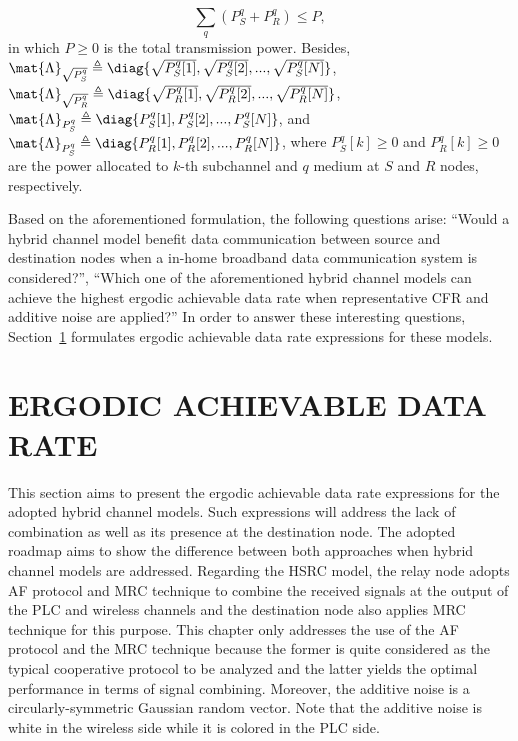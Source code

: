 \begin{equation}
	\sum_{q} (P_{S}^q + P_{R}^q) \leq P,
\end{equation}
in which $P \geq 0$ is the total transmission power. Besides, $ \mat{\Lambda}_{\sqrt{P_{S}^q}} \triangleq \diag\{\sqrt{P_{S}^q[1]},\sqrt{P_{S}^q[2]},...,\sqrt{P_{S}^q[N]}\}$, $ \mat{\Lambda}_{\sqrt{P_{R}^q}} \triangleq \diag\{\sqrt{P_{R}^q[1]},\sqrt{P_{R}^q[2]},...,\sqrt{P_{R}^q[N]}\}$, $ \mat{\Lambda}_{P_{S}^q} \triangleq \diag\{P_{S}^q[1],P_{S}^q[2],...,P_{S}^q[N]\}$, and $ \mat{\Lambda}_{P_{S}^q} \triangleq \diag\{P_{R}^q[1],P_{R}^q[2],...,P_{R}^q[N]\}$, where $ P_{S}^q[k] \geq 0 $ and $ P_{R}^q[k] \geq 0 $ are the power allocated to $k$-th subchannel and $ q $ medium at $S$ and $R$ nodes, respectively.

Based on the aforementioned formulation, the following questions arise: ``Would a hybrid channel model benefit data communication between source and destination nodes when a in-home broadband data communication system is considered?'', ``Which one of the aforementioned hybrid channel models can achieve the highest ergodic achievable data rate when representative \ac{CFR} and additive noise are applied?'' In order to answer these interesting questions, Section~\ref{sec:EADR_HSRC} formulates ergodic achievable data rate expressions for these models.

\section{ERGODIC ACHIEVABLE DATA RATE}  \label{sec:EADR_HSRC}

This section aims to present the ergodic achievable data rate expressions for the adopted hybrid channel models. Such expressions will address the lack of combination as well as its presence at the destination node. The adopted roadmap aims to show the difference between both approaches when hybrid channel models are addressed. Regarding the \ac{HSRC} model, the relay node adopts \ac{AF} protocol and \ac{MRC} technique to combine the received signals at the output of the \ac{PLC} and wireless channels and the destination node also applies \ac{MRC} technique for this purpose. This chapter only addresses the use of the \ac{AF} protocol and the \ac{MRC} technique because the former is quite considered as the typical cooperative protocol to be analyzed and the latter yields the optimal performance in terms of signal combining. Moreover, the additive noise is a circularly-symmetric Gaussian random vector. Note that the additive noise is white in the wireless side while it is colored in the \ac{PLC} side.

